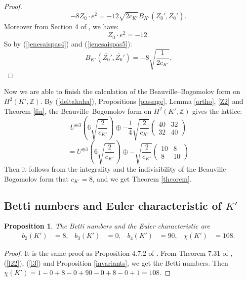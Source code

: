 \documentclass{alggeom}
\newcommand{\Z}{\mathbb{Z}}
\theoremstyle{plain}
\newtheorem{prop}[theorem]{Proposition}
\theoremstyle{definition}
\theoremstyle{remark}
\begin{document}
\begin{proof}
\begin{equation}
-8Z_0\cdot e^{2}=-12\sqrt{2c_{K'}}B_{K'}(\overline{Z_0}',\overline{Z_0}').
\label{jenesaispas4}
\end{equation}
Moreover from Section 4 of \cite{Hassett}, we have:
\begin{equation}
Z_0\cdot e^{2}=-12.
\label{jenesaispas5}
\end{equation}
So by (\ref{jenesaispas4}) and (\ref{jenesaispas5}):
$$B_{K'}(\overline{Z_0}',\overline{Z_0}')=-8\sqrt{\frac{1}{2c_{K'}}}.$$
\end{proof}
Now we are able to finish the calculation of the Beauville--Bogomolov form on $H^{2}(K',\Z)$.
By (\ref{deltahaha}), Propositions \ref{passage}, Lemma \ref{ortho}, \ref{Z2} and Theorem \ref{fin},
the Beauville--Bogomolov form on $H^{2}(K',\Z)$ gives the lattice:
$$ U^{\oplus3}\left(6\sqrt{\frac{2}{c_{K'}}}\right) \oplus -\frac{1}{4}\sqrt{\frac{2}{c_{K'}}}\left(
\begin{array}{cc}
40 & 32\\
32 & 40 
\end{array} \right)$$
$$=U^{\oplus3}\left(6\sqrt{\frac{2}{c_{K'}}}\right) \oplus -\sqrt{\frac{2}{c_{K'}}}\left(
\begin{array}{cc}
10 & 8\\
8 & 10 
\end{array} \right)$$
Then it follows from the integrality and the indivisibility of the Beauville--Bogomolov form that $c_{K'}=8$, and we get Theorem \ref{theorem}.
\subsection{Betti numbers and Euler characteristic of $K'$}
\begin{prop}\label{b}
The Betti numbers and the Euler characteristic are
\begin{align*}
 b_2(K')&=8,&
b_{3}(K')&=0,&
b_{4}(K')&=90,&
\chi(K')&=108.
\end{align*}
\end{prop}
\begin{proof}
It is the same proof as Proposition 4.7.2 of \cite{Lol}.
From Theorem 7.31 of \cite{Voisin}, (\ref{l22}), (\ref{l3}) and Proposition \ref{invariants}, we get the Betti numbers.
Then $\chi(K')=1-0+8-0+90-0+8-0+1=108$.
\end{proof}
\end{document}
